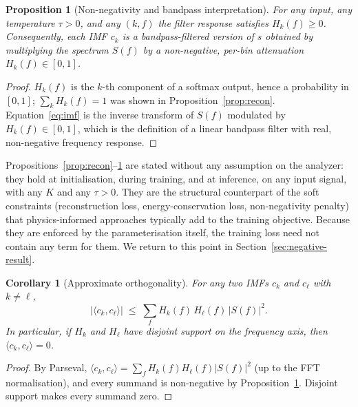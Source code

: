 \documentclass[journal]{IEEEtran}
\newtheorem{proposition}{Proposition}
\newtheorem{corollary}{Corollary}
\theoremstyle{remark}
\begin{document}
\begin{proposition}[Non-negativity and bandpass interpretation]
\label{prop:nonneg}
For any input, any temperature $\tau > 0$, and any $(k,f)$ the filter
response satisfies $H_{k}(f) \geq 0$. Consequently, each IMF $c_{k}$
is a bandpass-filtered version of $s$ obtained by multiplying the
spectrum $S(f)$ by a non-negative, per-bin attenuation
$H_{k}(f) \in [0,1]$.
\end{proposition}

\begin{proof}
$H_{k}(f)$ is the $k$-th component of a softmax output, hence a
probability in $[0,1]$; $\sum_{k} H_{k}(f) = 1$ was shown in
Proposition~\ref{prop:recon}. Equation~\eqref{eq:imf} is the inverse
transform of $S(f)$ modulated by $H_{k}(f) \in [0,1]$, which is the
definition of a linear bandpass filter with real, non-negative
frequency response.
\end{proof}

Propositions~\ref{prop:recon}--\ref{prop:nonneg} are stated without any
assumption on the analyzer: they hold at initialisation, during
training, and at inference, on any input signal, with any $K$ and any
$\tau > 0$. They are the structural counterpart of the soft constraints
(reconstruction loss, energy-conservation loss, non-negativity penalty)
that physics-informed approaches typically add to the training
objective. Because they are enforced by the parameterisation itself,
the training loss need not contain any term for them. We return to this
point in Section~\ref{sec:negative-result}.

\begin{corollary}[Approximate orthogonality]
\label{cor:ortho}
For any two IMFs $c_{k}$ and $c_{\ell}$ with $k \neq \ell$,
\begin{equation}
\lvert \langle c_{k}, c_{\ell} \rangle \rvert \;\leq\;
\sum_{f} H_{k}(f)\, H_{\ell}(f)\, \lvert S(f)\rvert^{2} .
\end{equation}
In particular, if $H_{k}$ and $H_{\ell}$ have disjoint support on the
frequency axis, then $\langle c_{k}, c_{\ell}\rangle = 0$.
\end{corollary}

\begin{proof}
By Parseval,
$\langle c_{k}, c_{\ell}\rangle =
\sum_{f} H_{k}(f) H_{\ell}(f) \lvert S(f)\rvert^{2}$ (up to the FFT
normalisation), and every summand is non-negative by
Proposition~\ref{prop:nonneg}. Disjoint support makes every summand
zero.
\end{proof}
\end{document}
